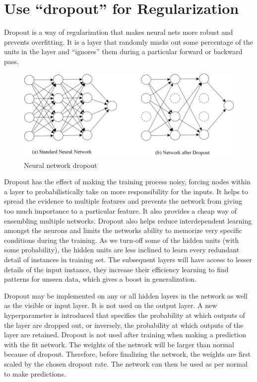 \section{Use “dropout” for Regularization}
Dropout is a way of regularization that makes neural nets more robust and prevents overfitting. 
It is a layer that randomly masks out some percentage of the units in the layer and “ignores” them during a particular forward or backward pass.

\begin{figure}[ht]
\centering
\includegraphics[width=120mm]{lectures/02-b/Dropout.png}
\caption{Neural network dropout}
\label{fig:dropout}
\end{figure}

Dropout has the effect of making the training process noisy, forcing nodes within a layer to probabilistically take on more responsibility for the inputs. 
It helps to spread the evidence to multiple features and prevents the network from giving too much importance to a particular feature. 
It also provides a cheap way of ensembling multiple networks. 
Dropout also helps reduce interdependent learning amongst the neurons and limits the networks ability to memorize very specific conditions during the training. 
As we turn-off some of the hidden units (with some probability), the hidden units are less inclined to learn every redundant detail of instances in training set. 
The subsequent layers will have access to lesser details of the input instance, they increase their efficiency learning to find patterns for unseen data, which gives a boost in generalization.

Dropout may be implemented on any or all hidden layers in the network as well as the visible or input layer. It is not used on the output layer. 
A new hyperparameter is introduced that specifies the probability at which outputs of the layer are dropped out, or inversely, the probability at which outputs of the layer are retained. 
Dropout is not used after training when making a prediction with the fit network. 
The weights of the network will be larger than normal because of dropout. 
Therefore, before finalizing the network, the weights are first scaled by the chosen dropout rate. 
The network can then be used as per normal to make predictions.

